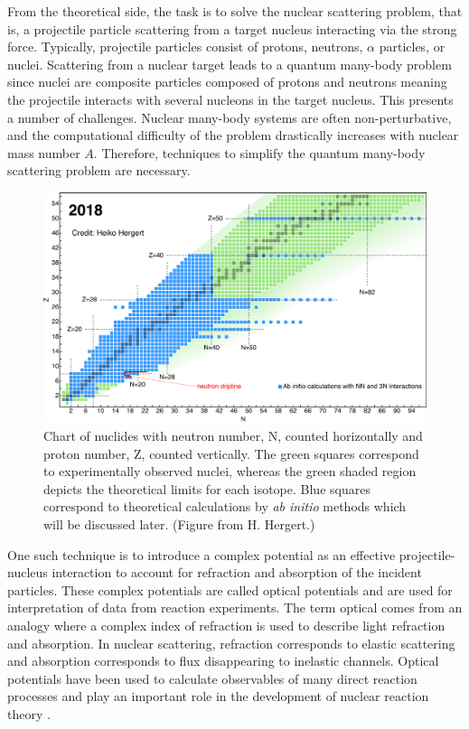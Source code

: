 \documentclass[preprintnumbers,floatfix,aps,prc,preprint,nofootinbib]{revtex4-1}
\begin{document}
From the theoretical side, the task is to solve the nuclear scattering problem, that is, a projectile particle scattering from a target nucleus interacting via the strong force. Typically, projectile particles consist of protons, neutrons, $\alpha$ particles, or nuclei. Scattering from a nuclear target leads to a quantum many-body problem since nuclei are composite particles composed of protons and neutrons meaning the projectile interacts with several nucleons in the target nucleus. This presents a number of challenges. Nuclear many-body systems are often non-perturbative, and the computational difficulty of the problem drastically increases with nuclear mass number $A$. Therefore, techniques to simplify the quantum many-body scattering problem are necessary.
\\

%
\begin{figure}
	\captionsetup{singlelinecheck=false,justification=raggedright}
	\centering
	\includegraphics[width=14cm]{nuclear_chart_2018}
	\caption{Chart of nuclides with neutron number, N, counted horizontally and proton number, Z, counted vertically. The green squares correspond to experimentally observed nuclei, whereas the green shaded region depicts the theoretical limits for each isotope. Blue squares correspond to theoretical calculations by \textit{ab initio} methods which will be discussed later. (Figure from H. Hergert.)}
	\label{fig:nuclear_chart_2018}
\end{figure}
%

One such technique is to introduce a complex potential as an effective projectile-nucleus interaction to account for refraction and absorption of the incident particles. These complex potentials are called optical potentials and are used for interpretation of data from reaction experiments. The term optical comes from an analogy where a complex index of refraction is used to describe light refraction and absorption. In nuclear scattering, refraction corresponds to elastic scattering and absorption corresponds to flux disappearing to inelastic channels. Optical potentials have been used to calculate observables of many direct reaction processes and play an important role in the development of nuclear reaction theory \cite{thompson_nunes_2009}.
\\
\end{document}
